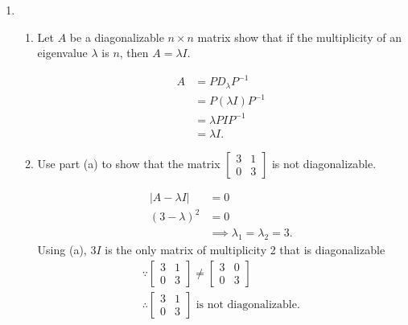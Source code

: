 \documentclass{zc-ust-hw}
\begin{document}
\begin{enumerate}
  \item \,
    \begin{enumerate}
      \item Let \(A\) be a diagonalizable \(n\times n\)  matrix show that if the
        multiplicity of an eigenvalue \(\lambda\) is \(n\), then \(A=\lambda I\). 
        \begin{sol}
          \begin{align}
            A&= PD_{\lambda }P^{-1} \\
             &= P(\lambda I)P^{-1} \\
             &= \lambda PIP^{-1} \\
             &= \lambda I
          .\end{align}
        \end{sol}
      \item Use part (a) to show that the matrix \( \begin{bmatrix} 3&1\\0&3 \end{bmatrix}  \) is not diagonalizable. 
        \begin{sol}
          \begin{align}
            |A-\lambda I| &= 0 \\
            (3-\lambda)^2&= 0 \\
                         &\implies \lambda_{1}=\lambda_{2}=3
          .\end{align}
          Using (a), \(3I\) is the only matrix of multiplicity 2 that is
          diagonalizable
          \begin{gather}
            \because \begin{bmatrix} 3&1\\0&3 \end{bmatrix} \neq \begin{bmatrix} 3&0\\0&3 \end{bmatrix} \\
            \therefore \begin{bmatrix} 3&1\\0&3 \end{bmatrix} \text{ is not diagonalizable}
          .\end{gather}
        \end{sol}
    \end{enumerate}

    \newpage


\end{enumerate}
\end{document}

